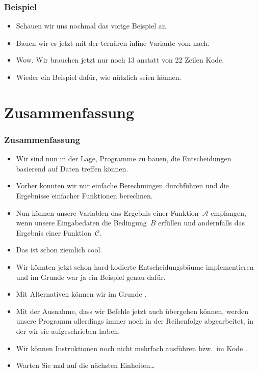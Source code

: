 \documentclass[aspectratio=169,mathserif,notheorems]{beamer}%
\begin{document}
\begin{frame}[t]%
\frametitle{Beispiel}%
%
\parbox{0.4\paperwidth}{\small{%
\begin{itemize}%
\item Schauen wir uns nochmal das vorige Beispiel an.%
\item<2-> Bauen wir es jetzt mit der ternären inline Variante vom  nach.%
\item<4-> Wow. Wir brauchen jetzt nur noch 13 anstatt von 22 Zeilen Kode.%
\item<5-> Wieder ein Beispiel dafür, wie nützlich  seien können.%
\end{itemize}%
}}%
%
%
%
%
%
\end{frame}%
%
\section{Zusammenfassung}%
%
\begin{frame}%
\frametitle{Zusammenfassung}%
\begin{itemize}%
\item Wir sind nun in der Lage, Programme zu bauen, die Entscheidungen basierend auf Daten treffen können.%
%
\item<2-> Vorher konnten wir nur einfache Berechnungen durchführen und die Ergebnisse einfacher Funktionen berechnen.%
%
\item<3-> Nun können unsere Variablen das Ergebnis einer Funktion~${\mathcal{A}}$ empfangen, wenn unsere Eingabedaten die Bedingung~$B$ erfüllen und andernfalls das Ergebnis einer Funktion~${\mathcal{C}}$.%
%
\item<4-> Das ist schon ziemlich cool.%
%
\item<5-> Wir könnten jetzt schon hard-kodierte Entscheidungsbäume implementieren~\cite{RN2022AIAMA,SSBD2014UMLFTTA} und im Grunde war ja  ein Beispiel genau dafür.%
%
\item<6-> Mit Alternativen können wir im Grunde .%
%
\item<6-> Mit der Ausnahme, dass wir Befehle jetzt auch übergehen können, werden unsere Programm allerdings immer noch in der Reihenfolge abgearbeitet, in der wir sie aufgeschrieben haben.%
%
\item<7-> Wir können Instruktionen noch nicht mehrfach ausführen bzw.\ im Kode .%
%
\item<8-> Warten Sie mal auf die nächsten Einheiten\dots%
\end{itemize}%
%
\end{frame}%
%
\endPresentation%
\end{document}
